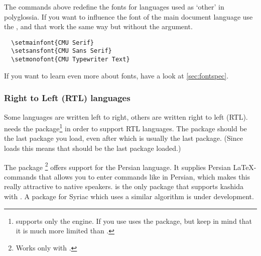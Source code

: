 The commands above redefine the fonts for languages used as \enquote*{other} in
polyglossia. If you want to influence the font of the main document language
use the ,  and  that work the
same way but without the  argument.
\begin{verbatim}
  \setmainfont{CMU Serif}
  \setsansfont{CMU Sans Serif}
  \setmonofont{CMU Typewriter Text}
\end{verbatim}

If you want to learn even more about fonts, have a look at
\autoref{sec:fontspec}.

\subsubsection{Right to Left (RTL) languages}

Some languages are written left to right, others are written right to left
(RTL).  needs the  package\footnote{
  supports only the  engine. If you use 
   uses the  package, but keep in mind that it is
  much more limited than .} in order to support RTL languages. The
 package should be the last package you load, even after
 which is usually the last package. (Since 
loads  this means that  should be the last package
loaded.)


The package \footnote{Works only with
  .} offers support for the Persian language. It
supplies Persian \LaTeX-commands that allows you to enter commands like
 in Persian, which makes this really attractive to native speakers.
 is the only package that supports kashida with
. A package for Syriac which uses a similar algorithm is under
development.

